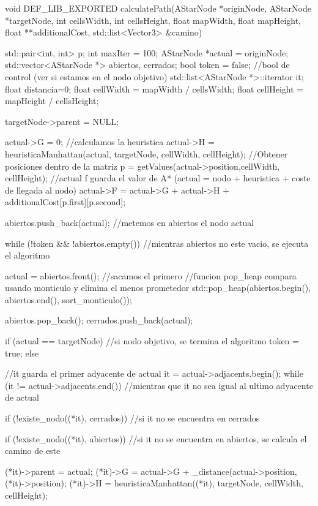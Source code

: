 void DEF_LIB_EXPORTED calculatePath(AStarNode *originNode, AStarNode *targetNode, int cellsWidth, int cellsHeight, float mapWidth, float mapHeight, float **additionalCost, std::list<Vector3> &camino)
{
    std::pair<int, int> p;
    int maxIter = 100; 
    AStarNode *actual = originNode;
    std::vector<AStarNode *> abiertos, cerrados;
    bool token = false; //bool de control (ver si estamos en el nodo objetivo)
    std::list<AStarNode *>::iterator it;
    float distancia=0;
    float cellWidth = mapWidth / cellsWidth;
    float cellHeight = mapHeight / cellsHeight;
    
    targetNode->parent = NULL;

    actual->G = 0;
    //calculamos la heuristica
    actual->H = heuristicaManhattan(actual, targetNode, cellWidth, cellHeight);
    //Obtener posiciones dentro de la matriz
    p = getValues(actual->position,cellWidth, cellHeight);
    //actual f guarda el valor de A* (actual = nodo + heuristica + coste de llegada al nodo)
    actual->F = actual->G + actual->H + additionalCost[p.first][p.second];
    
    abiertos.push_back(actual); //metemos en abiertos el nodo actual

    while (!token && !abiertos.empty()) //mientras abiertos no este vacio, se ejecuta el algoritmo
    {
        actual = abiertos.front(); //sacamos el primero
        //funcion pop_heap compara usando monticulo y elimina el menos prometedor
        std::pop_heap(abiertos.begin(), abiertos.end(), sort_monticulo());

        abiertos.pop_back();
        cerrados.push_back(actual);
        
        if (actual == targetNode) //si nodo objetivo, se termina el algoritmo
        {
            token = true;
        }
        else
        {   //it guarda el primer adyacente de actual
            it = actual->adjacents.begin();
            while (it != actual->adjacents.end()) //mientras que it no sea igual al ultimo adyacente de actual
            {
                if (!existe_nodo((*it), cerrados)) //si it no se encuentra en cerrados
                {
                    if (!existe_nodo((*it), abiertos)) //si it no se encuentra en abiertos, se calcula el camino de este
                    {
                        (*it)->parent = actual;
                        (*it)->G = actual->G + _distance(actual->position, (*it)->position);
                        (*it)->H = heuristicaManhattan((*it), targetNode, cellWidth, cellHeight);
                        
}}}}}}
